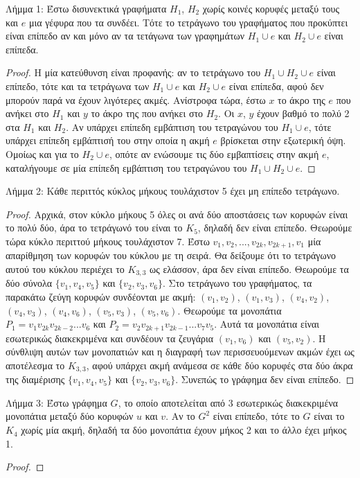 \documentclass[a4paper, oneside, 11pt]{article}
\theoremstyle{definition}
\begin{document}
\begin{enumerate}
Λήμμα 1: Έστω δισυνεκτικά γραφήματα $H_1$, $H_2$ χωρίς κοινές κορυφές μεταξύ τους και $e$ μια γέφυρα που τα συνδέει. Τότε το τετράγωνο του γραφήματος που προκύπτει είναι επίπεδο αν και
μόνο αν τα τετάγωνα των γραφημάτων $H_1 \cup e$ και $H_2 \cup e$ είναι επίπεδα.
	\begin{proof}
Η μία κατεύθυνση είναι προφανής: αν το τετράγωνο του $H_1\cup H_2\cup e$ είναι επίπεδο, τότε και τα τετράγωνα των $H_1\cup e$ και $H_2\cup e$ είναι επίπεδα, αφού δεν μπορούν παρά να έχουν λιγότερες ακμές.
Ανίστροφα τώρα, έστω $x$ το άκρο της $e$ που ανήκει στο $H_1$ και $y$ το άκρο της που ανήκει στο $H_2$. Οι $x$, $y$ έχουν βαθμό το πολύ 2 στα $H_1$ και $H_2$. 
Αν υπάρχει επίπεδη εμβάπτιση του τετραγώνου του $H_1\cup e$, τότε υπάρχει επίπεδη εμβάπτισή του στην οποία η ακμή $e$ βρίσκεται στην εξωτερική όψη. 
Ομοίως και για το $H_2\cup e$, οπότε αν ενώσουμε τις δύο εμβαπτίσεις στην ακμή $e$, καταλήγουμε σε μία επίπεδη εμβάπτιση του τετραγώνου του $H_1\cup H_2\cup e$.
	\end{proof}
Λήμμα 2: Κάθε περιττός κύκλος μήκους τουλάχιστον 5 έχει μη επίπεδο τετράγωνο.
	\begin{proof}
Αρχικά, στον κύκλο μήκους 5 όλες οι ανά δύο αποστάσεις των κορυφών είναι το πολύ δύο, άρα το τετράγωνό του είναι το $K_5$, δηλαδή δεν είναι επίπεδο. Θεωρούμε τώρα κύκλο περιττού μήκους τουλάχιστον 7.
Έστω $v_1, v_2, ..., v_{2k}, v_{2k+1}, v_1$ μία απαρίθμηση των κορυφών του κύκλου με τη σειρά. Θα δείξουμε ότι το τετράγωνο αυτού του κύκλου περιέχει το $K_{3,3}$ ως ελάσσον,
άρα δεν είναι επίπεδο. Θεωρούμε τα δύο σύνολα $\{v_1,v_4,v_5\}$ και $\{v_2,v_3,v_6\}$. Στο τετράγωνο του γραφήματος, τα παρακάτω ζεύγη κορυφών συνδέονται με ακμή: $(v_1, v_2)$, $(v_1,v_3)$, $(v_4,v_2)$,
$(v_4,v_3)$, $(v_4,v_6)$, $(v_5,v_3)$, $(v_5,v_6)$. Θεωρούμε τα μονοπάτια $P_1=v_1 v_{2k} v_{2k-2} ... v_6$ και $P_2=v_2 v_{2k+1} v_{2k-1} ... v_7 v_5$. Αυτά τα μονοπάτια είναι εσωτερικώς διακεκριμένα και 
συνδέουν τα ζευγάρια $(v_1,v_6)$ και $(v_5,v_2)$. Η σύνθλιψη αυτών των μονοπατιών και η διαγραφή των περισσευούμενων ακμών έχει ως αποτέλεσμα το $K_{3,3}$, αφού υπάρχει ακμή ανάμεσα σε κάθε δύο κορυφές
στα δύο άκρα της διαμέρισης $\{v_1,v_4,v_5\}$ και $\{v_2,v_3,v_6\}$. Συνεπώς το γράφημα δεν είναι επίπεδο.
	\end{proof}
Λήμμα 3: Έστω γράφημα $G$, το οποίο αποτελείται από 3 εσωτερικώς διακεκριμένα μονοπάτια μεταξύ δύο κορυφών $u$ και $v$. Αν το $G^2$ είναι επίπεδο, τότε το $G$ είναι το $K_4$ χωρίς μία ακμή, δηλαδή τα 
δύο μονοπάτια έχουν μήκος 2 και το άλλο έχει μήκος 1.
	\begin{proof}

\end{proof}
\end{enumerate}
\end{document}
